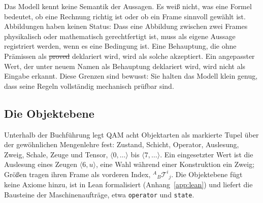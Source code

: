 Das Modell kennt keine Semantik der Aussagen. Es weiß nicht, was eine Formel bedeutet, ob eine Rechnung richtig ist oder ob ein Frame
sinnvoll gewählt ist. Abbildungen haben keinen Status: Dass eine Abbildung zwischen zwei Frames physikalisch oder mathematisch
gerechtfertigt ist, muss als eigene Aussage registriert werden, wenn es eine Bedingung ist. Eine Behauptung, die ohne Prämissen als
\st{proved} deklariert wird, wird als solche akzeptiert. Ein angepasster Wert, der unter neuem Namen als Behauptung deklariert wird, wird nicht
als Eingabe erkannt. Diese Grenzen sind bewusst: Sie halten das Modell klein genug, dass seine Regeln vollständig mechanisch prüfbar sind.

\subsection{Die Objektebene}

Unterhalb der Buchführung legt QAM acht Objektarten als markierte Tupel über der gewöhnlichen Mengenlehre fest: Zustand, Schicht,
Operator, Auslesung, Zweig, Schale, Zeuge und Tensor, \(\langle0,\dots\rangle\) bis \(\langle7,\dots\rangle\). Ein eingesetzter Wert ist die
Auslesung eines Zeugen \(\langle6,u\rangle\), eine Wahl während einer Konstruktion ein Zweig; Größen tragen ihren Frame als vorderen Index,
\({}^{A}{}_{B}\mathcal T^{i}{}_{j}\). Die Objektebene fügt keine Axiome hinzu, ist in Lean formalisiert (Anhang~\ref{app:lean}) und liefert
die Bausteine der Maschinenaufträge, etwa \texttt{operator} und \texttt{state}.
